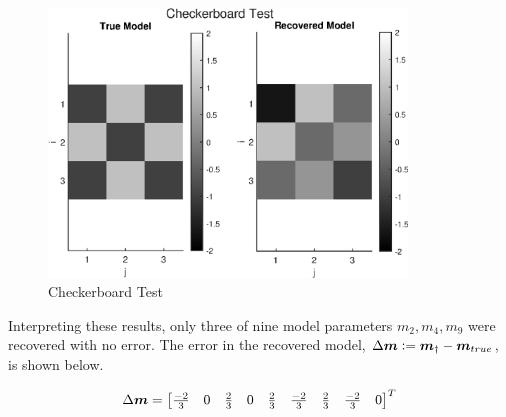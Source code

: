 \begin{figure}[h] 
	\centering
	\includegraphics[width=0.85\textwidth]{./images/prob1_checkerboard_test.eps}
	\caption{Checkerboard Test}
	\label{fig: prob1 checkerboard test}
\end{figure}
\FloatBarrier

Interpreting these results, only three of nine model parameters $m_2, m_4, m_9$ were recovered with no error. The error in the recovered model, $\Delta \boldsymbol{m} \vcentcolon= \boldsymbol{m}_{\dagger} - \boldsymbol{m}_{true}$, is shown below.

\begin{align*}
	\Delta \boldsymbol{m} = \begin{bmatrix}
		\frac{-2}{3} & 0 & \frac{2}{3} & 0 & \frac{2}{3} & \frac{-2}{3} & \frac{2}{3} & \frac{-2}{3} & 0
	\end{bmatrix}^T
\end{align*}


